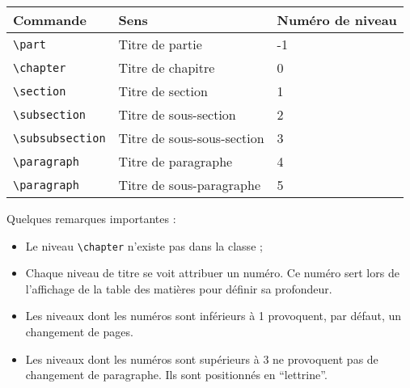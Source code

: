  	\begin{tabular}{|l||l|l|}
	\hline 	
 	Commande 				& Sens 						& Numéro de niveau 	\\
 	\hline
 	\hline
 	\verb|\part| 			& Titre de partie 			& -1	 \\
 	\verb|\chapter| 		& Titre de chapitre 		& 0 	 	 \\
	\verb|\section|			& Titre de section  		& 1			\\
	\verb|\subsection|		& Titre de sous-section 	& 2			\\
	\verb|\subsubsection|	& Titre de sous-sous-section& 3			\\
	\verb|\paragraph|		& Titre de paragraphe 		&4			\\
	\verb|\paragraph|		& Titre de sous-paragraphe 	&5			\\
	\hline
	\end{tabular}


Quelques remarques importantes :
\begin{itemize}
\item Le niveau \verb|\chapter| n'existe pas dans la classe  ;
\item Chaque niveau de titre se voit attribuer un numéro. Ce numéro sert lors de l'affichage de la table des matières pour définir sa profondeur.
\item Les niveaux dont les numéros sont inférieurs à 1 provoquent, par défaut, un changement de pages.
\item Les niveaux dont les numéros sont supérieurs à 3 ne provoquent pas de changement de paragraphe. Ils sont positionnés en \enquote{lettrine}.
\end{itemize}

